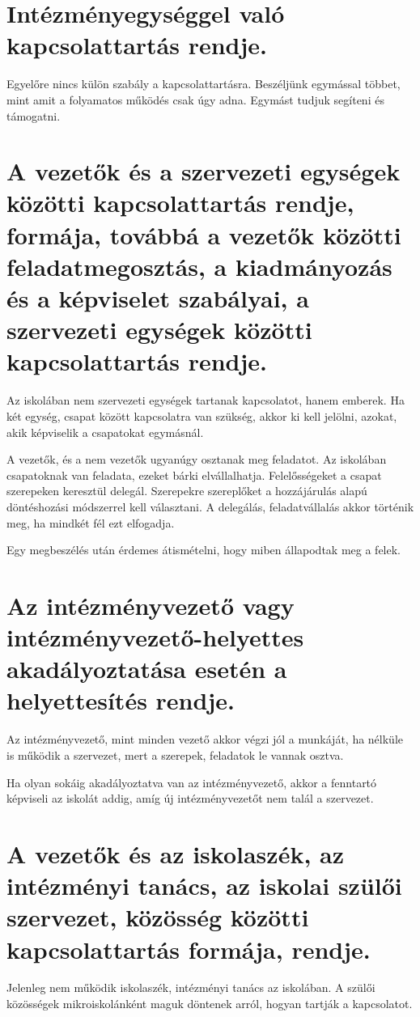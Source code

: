 \section{Intézményegységgel való kapcsolattartás rendje.}
Egyelőre nincs külön szabály a kapcsolattartásra. Beszéljünk egymással többet, mint amit a folyamatos működés csak úgy adna. Egymást tudjuk segíteni és támogatni.



\section{A vezetők és a szervezeti egységek közötti kapcsolattartás rendje, formája, továbbá a vezetők közötti feladatmegosztás, a kiadmányozás és a képviselet szabályai, a szervezeti egységek közötti kapcsolattartás rendje.}
Az iskolában nem szervezeti egységek tartanak kapcsolatot, hanem emberek. Ha két egység, csapat között kapcsolatra van szükség, akkor ki kell jelölni, azokat, akik képviselik a csapatokat egymásnál.

A vezetők, és a nem vezetők ugyanúgy osztanak meg feladatot. Az iskolában csapatoknak van feladata, ezeket bárki elvállalhatja. Felelősségeket a csapat szerepeken keresztül delegál. Szerepekre szereplőket a hozzájárulás alapú döntéshozási módszerrel kell választani. A delegálás, feladatvállalás akkor történik meg, ha mindkét fél ezt elfogadja.

Egy megbeszélés után érdemes átismételni, hogy miben állapodtak meg a felek.


\section{Az intézményvezető vagy intézményvezető-helyettes akadályoztatása esetén a helyettesítés rendje.}
Az intézményvezető, mint minden vezető akkor végzi jól a munkáját, ha nélküle is működik a szervezet, mert a szerepek, feladatok le vannak osztva.

Ha olyan sokáig akadályoztatva van az intézményvezető, akkor a fenntartó képviseli az iskolát addig, amíg új intézményvezetőt nem talál a szervezet.

\section{A vezetők és az iskolaszék, az intézményi tanács, az iskolai szülői szervezet, közösség közötti kapcsolattartás formája, rendje.}
Jelenleg nem működik iskolaszék, intézményi tanács az iskolában. A szülői közösségek mikroiskolánként maguk döntenek arról, hogyan tartják a kapcsolatot.


